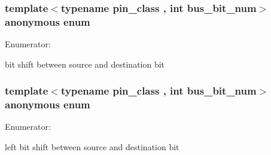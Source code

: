 \hypertarget{structavrpp_1_1bus_1_1bus__pin_a9ed54c4fed3cd88343a441825be92e7f}{
\subsubsection[{"@5}]{\setlength{\rightskip}{0pt plus 5cm}template$<$typename pin\_\-class , int bus\_\-bit\_\-num$>$ anonymous enum}}
\label{structavrpp_1_1bus_1_1bus__pin_a9ed54c4fed3cd88343a441825be92e7f}
\begin{Desc}
\item[Enumerator: ]\par
\begin{description}
\item[{\em 
\hypertarget{structavrpp_1_1bus_1_1bus__pin_a9ed54c4fed3cd88343a441825be92e7fab86815a400017547219f3fcf4c902574}{
bit\_\-shift}
\label{structavrpp_1_1bus_1_1bus__pin_a9ed54c4fed3cd88343a441825be92e7fab86815a400017547219f3fcf4c902574}
}]bit shift between source and destination bit \end{description}
\end{Desc}

\hypertarget{structavrpp_1_1bus_1_1bus__pin_a874e1f75a91b859d349b1d251bc55d83}{
\subsubsection[{"@6}]{\setlength{\rightskip}{0pt plus 5cm}template$<$typename pin\_\-class , int bus\_\-bit\_\-num$>$ anonymous enum}}
\label{structavrpp_1_1bus_1_1bus__pin_a874e1f75a91b859d349b1d251bc55d83}
\begin{Desc}
\item[Enumerator: ]\par
\begin{description}
\item[{\em 
\hypertarget{structavrpp_1_1bus_1_1bus__pin_a874e1f75a91b859d349b1d251bc55d83a4981695193f4d4a2f01ce564e86ebbe7}{
lshift}
\label{structavrpp_1_1bus_1_1bus__pin_a874e1f75a91b859d349b1d251bc55d83a4981695193f4d4a2f01ce564e86ebbe7}
}]left bit shift between source and destination bit \end{description}
\end{Desc}

